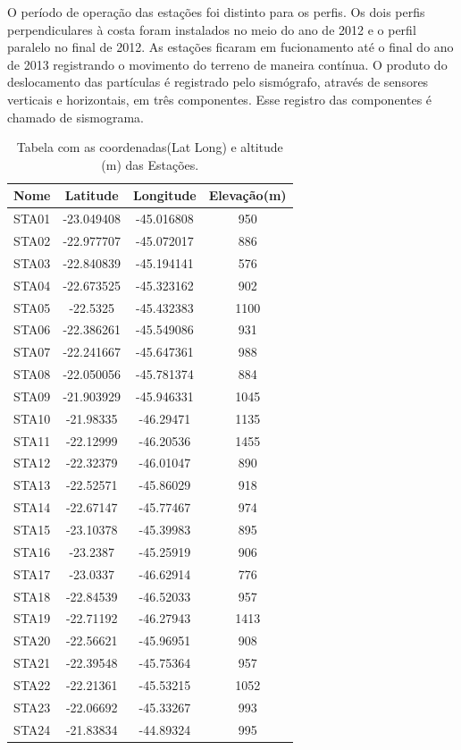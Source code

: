 O período de operação das estações foi distinto para os perfis. Os dois perfis perpendiculares à costa foram instalados no meio do ano de 2012 e o perfil paralelo no final de 2012. As estações ficaram em fucionamento até o final do ano de 2013 registrando o movimento do terreno de maneira contínua. O produto do deslocamento das partículas é registrado pelo sismógrafo, através de sensores verticais e horizontais, em três componentes. Esse registro das componentes é chamado de sismograma. 

\begin{center}
\begin{table}[!ht]
\caption{Tabela com as coordenadas(Lat Long) e altitude (m) das Estações.}
\begin{center}
\begin{tabular}{| c | c | c | c |}
\toprule
{\large \textbf{Nome}} &	{\large \textbf{Latitude}} & {\large \textbf{Longitude}} & {\large \textbf{Elevação(m)}}\\
\bottomrule
STA01 & -23.049408 & -45.016808 & 950\\
STA02 & -22.977707 & -45.072017 & 886\\
STA03 & -22.840839 & -45.194141 & 576\\
STA04 & -22.673525 & -45.323162 & 902\\
STA05 & -22.5325 & -45.432383 & 1100\\
STA06 & -22.386261 & -45.549086 & 931\\
STA07 & -22.241667 & -45.647361 & 988\\
STA08 & -22.050056 & -45.781374 & 884\\
STA09 & -21.903929 & -45.946331 & 1045\\
STA10 & -21.98335 & -46.29471 & 1135\\
STA11 & -22.12999 & -46.20536 & 1455\\
STA12 & -22.32379 & -46.01047 & 890\\
STA13 & -22.52571 & -45.86029 & 918\\
STA14 & -22.67147 & -45.77467 & 974\\
STA15 & -23.10378 & -45.39983 & 895\\
STA16 & -23.2387 & -45.25919 & 906\\
STA17 & -23.0337 & -46.62914 & 776\\
STA18 & -22.84539 & -46.52033 & 957\\
STA19 & -22.71192 & -46.27943 & 1413\\
STA20 & -22.56621 & -45.96951 & 908\\
STA21 & -22.39548 & -45.75364 & 957\\
STA22 & -22.21361 & -45.53215 & 1052\\
STA23 & -22.06692 & -45.33267 & 993\\
STA24 & -21.83834 & -44.89324 & 995\\
\hline
\end{tabular}
\label{tabela1}
\end{center}
\end{table}
\end{center}

